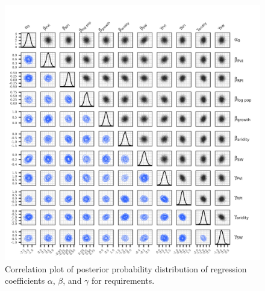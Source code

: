 \documentclass[draft]{agujournal}
\begin{document}
\begin{figure}
\includegraphics[width=6.25in]{figures_si/req_pairs_plot-1} \caption[Correlation plot of posterior probability distribution of regression coefficients $\alpha$, $\beta$, and $\gamma$ for requirements]{Correlation plot of posterior probability distribution of regression coefficients $\alpha$, $\beta$, and $\gamma$ for requirements.}\label{fig:req_pairs_plot}
\end{figure}



\end{document}

